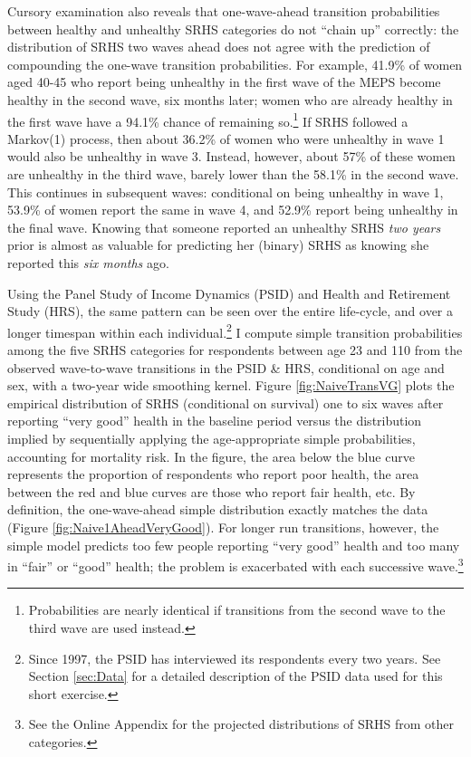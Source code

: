 \documentclass[12pt,pdftex,letterpaper]{article}
\begin{document}
Cursory examination also reveals that one-wave-ahead transition probabilities between healthy and unhealthy SRHS categories do not ``chain up'' correctly: the distribution of SRHS two waves ahead does not agree with the prediction of compounding the one-wave transition probabilities.  For example, 41.9\% of women aged 40-45 who report being unhealthy in the first wave of the MEPS become healthy in the second wave, six months later; women who are already healthy in the first wave have a 94.1\% chance of remaining so.\footnote{Probabilities are nearly identical if transitions from the second wave to the third wave are used instead.}  If SRHS followed a Markov(1) process, then about 36.2\% of women who were unhealthy in wave 1 would also be unhealthy in wave 3.  Instead, however, about 57\% of these women are unhealthy in the third wave, barely lower than the 58.1\% in the second wave.  This continues in subsequent waves: conditional on being unhealthy in wave 1, 53.9\% of women report the same in wave 4, and 52.9\% report being unhealthy in the final wave.  Knowing that someone reported an unhealthy SRHS \textit{two years} prior is almost as valuable for predicting her (binary) SRHS as knowing she reported this \textit{six months} ago.

Using the Panel Study of Income Dynamics (PSID) and Health and Retirement Study (HRS), the same pattern can be seen over the entire life-cycle, and over a longer timespan within each individual.\footnote{Since 1997, the PSID has interviewed its respondents every two years. See Section \ref{sec:Data} for a detailed description of the PSID data used for this short exercise.} I compute simple transition probabilities among the five SRHS categories for respondents between age 23 and 110 from the observed wave-to-wave transitions in the PSID \& HRS, conditional on age and sex, with a two-year wide smoothing kernel.  Figure \ref{fig:NaiveTransVG} plots the empirical distribution of SRHS (conditional on survival) one to six waves after reporting ``very good'' health in the baseline period versus the distribution implied by sequentially applying the age-appropriate simple probabilities, accounting for mortality risk. In the figure, the area below the blue curve represents the proportion of respondents who report poor health, the area between the red and blue curves are those who report fair health, etc. By definition, the one-wave-ahead simple distribution exactly matches the data (Figure \ref{fig:Naive1AheadVeryGood}).  For longer run transitions, however, the simple model predicts too few people reporting ``very good'' health and too many in ``fair'' or ``good'' health; the problem is exacerbated with each successive wave.\footnote{See the Online Appendix for the projected distributions of SRHS from other categories.}
\end{document}
